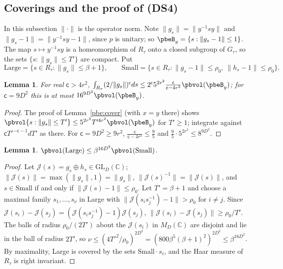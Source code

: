 \documentclass[10pt]{amsart}
\newtheorem{lemma}[theorem]{Lemma}
\theoremstyle{definition}
\theoremstyle{remark}
\newcommand{\C}{\mathbb C}
\begin{document}
\subsection{Coverings and the proof of \texorpdfstring{\textup{(DS4)}}{(DS4)}}\label{pbp:ss-cone}

In this subsection $\|\cdot\|$ is the operator norm. Note $\|g_s\|=\|y^{-1}sy\|$ and $\|g_s-1\|=
\|y^{-1}sy-1\|$, since $p$ is unitary; so $\pbeB_y=\{s:\|g_s-1\|\le1\}$. The map $s\mapsto y^{-1}sy$ is a
homeomorphism of $R_\tau$ onto a closed subgroup of $G_\tau$, so the sets $\{s:\|g_s\|\le T'\}$ are
compact. Put
\[
\mathrm{Large}=\{s\in R_\tau:\|g_s\|\le\beta+1\},\qquad\mathrm{Small}=\{s\in R_\tau:\|g_s-1\|\le\rho_0,\
\|h_s-1\|\le\rho_0\}.
\]

\begin{lemma}\label{pbp:cover1}
For real $\mathsf c>4r^2$, $\int_{R_\tau}(2/\|g_s\|)^{\mathsf c}ds\le2^{\mathsf c}5^{2r^2}\frac{\mathsf c}{
\mathsf c-4r^2}\pbvol(\pbeB_y)$; for $\mathsf c=9D^2$ this is at most $16^{9D^2}\pbvol(\pbeB_y)$.
\end{lemma}
\begin{proof}
The proof of Lemma~\ref{pbe:cover} (with $x=y$ there) shows $\pbvol\{s:\|g_s\|\le T'\}\le5^{2r^2}
T'^{4r^2}\pbvol(\pbeB_y)$ for $T'\ge1$; integrate against $\mathsf cT'^{-\mathsf c-1}dT'$ as there. For
$\mathsf c=9D^2\ge9r^2$, $\frac{\mathsf c}{\mathsf c-4r^2}\le\frac95$ and $\frac95\cdot5^{2r^2}\le8^{9D^2}$.
\end{proof}

\begin{lemma}\label{pbp:cover2}
$\pbvol(\mathrm{Large})\le\beta^{16D^2}\pbvol(\mathrm{Small})$.
\end{lemma}
\begin{proof}
Let $\mathcal J(s)=g_s\oplus h_s\in\mathrm{GL}_D(\C)$; $\|\mathcal J(s)\|=\max(\|g_s\|,1)=\|g_s\|$,
$\|\mathcal J(s)^{-1}\|=\|\mathcal J(s)\|$, and $s\in\mathrm{Small}$ if and only if $\|\mathcal J(s)-1\|\le
\rho_0$. Let $T'=\beta+1$ and choose a maximal family $s_1,\dots,s_\nu$ in Large with $\|\mathcal J(s_i
s_j^{-1})-1\|>\rho_0$ for $i\ne j$. Since $\mathcal J(s_i)-\mathcal J(s_j)=(\mathcal J(s_is_j^{-1})-1)
\mathcal J(s_j)$, $\|\mathcal J(s_i)-\mathcal J(s_j)\|\ge\rho_0/T'$. The balls of radius $\rho_0/(2T')$ about
the $\mathcal J(s_i)$ in $M_D(\C)$ are disjoint and lie in the ball of radius $2T'$, so $\nu\le
(4T'^2/\rho_0)^{2D^2}=(800\beta^5(\beta+1)^2)^{2D^2}\le\beta^{16D^2}$. By maximality, Large is covered
by the sets $\mathrm{Small}\cdot s_i$, and the Haar measure of $R_\tau$ is right invariant.
\end{proof}
\end{document}
